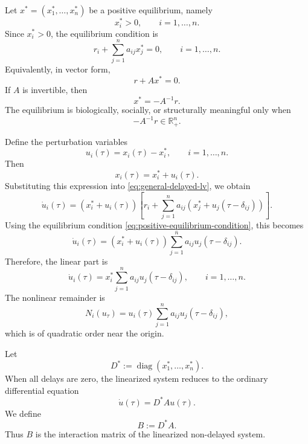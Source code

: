 \documentclass[11pt]{article}
\begin{document}
 Let $x^\ast=(x_1^\ast,\ldots,x_n^\ast)$ be a positive equilibrium, namely
 \[
 x_i^\ast>0,
 \qquad i=1,\ldots,n.
 \]
 Since $x_i^\ast>0$, the equilibrium condition is
 \begin{equation}
 \label{eq:positive-equilibrium-condition}
 r_i+\sum_{j=1}^{n}a_{ij}x_j^\ast=0,
 \qquad i=1,\ldots,n.
 \end{equation}
 Equivalently, in vector form,
 \begin{equation}
 \label{eq:equilibrium-vector-form}
 r+Ax^\ast=0.
 \end{equation}
 If $A$ is invertible, then
 \begin{equation}
 \label{eq:equilibrium-explicit}
 x^\ast=-A^{-1}r.
 \end{equation}
 The equilibrium is biologically, socially, or structurally meaningful only when
 \[
 -A^{-1}r\in\mathbb{R}^n_+.
 \]
 
 
 Define the perturbation variables
 \[
 u_i(\tau)=x_i(\tau)-x_i^\ast,
 \qquad i=1,\ldots,n.
 \]
 Then
 \[
 x_i(\tau)=x_i^\ast+u_i(\tau).
 \]
 Substituting this expression into \eqref{eq:general-delayed-lv}, we obtain
 \[
 \dot{u}_i(\tau)
 =
 \left(x_i^\ast+u_i(\tau)\right)
 \left[
 r_i+
 \sum_{j=1}^{n}
 a_{ij}
 \left(
 x_j^\ast+u_j(\tau-\delta_{ij})
 \right)
 \right].
 \]
 Using the equilibrium condition \eqref{eq:positive-equilibrium-condition}, this becomes
 \[
 \dot{u}_i(\tau)
 =
 \left(x_i^\ast+u_i(\tau)\right)
 \sum_{j=1}^{n}
 a_{ij}u_j(\tau-\delta_{ij}).
 \]
 Therefore, the linear part is
 \begin{equation}
 \label{eq:linearized-system}
 \dot{u}_i(\tau)
 =
 x_i^\ast
 \sum_{j=1}^{n}
 a_{ij}u_j(\tau-\delta_{ij}),
 \qquad i=1,\ldots,n.
 \end{equation}
 The nonlinear remainder is
 \[
 N_i(u_\tau)
 =
 u_i(\tau)
 \sum_{j=1}^{n}
 a_{ij}u_j(\tau-\delta_{ij}),
 \]
 which is of quadratic order near the origin.
 
 Let
 \[
 D^\ast:=\operatorname{diag}(x_1^\ast,\ldots,x_n^\ast).
 \]
 When all delays are zero, the linearized system reduces to the ordinary
 differential equation
 \[
 \dot{u}(\tau)=D^\ast A u(\tau).
 \]
 We define
 \begin{equation}
 \label{eq:B-matrix}
 B:=D^\ast A.
 \end{equation}
 Thus $B$ is the interaction matrix of the linearized non-delayed system.
 
\end{document}
